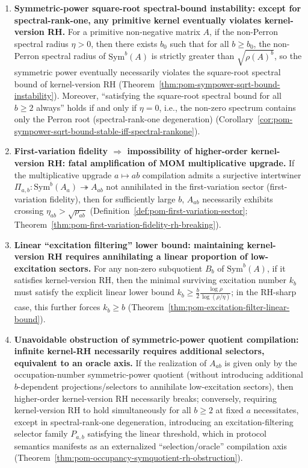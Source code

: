 \begin{enumerate}
  \item \textbf{Symmetric-power square-root spectral-bound instability: except for spectral-rank-one, any primitive kernel eventually violates kernel-version RH.}
  For a primitive non-negative matrix \(A\), if the non-Perron spectral radius \(\eta>0\), then there exists \(b_0\) such that for all \(b\ge b_0\), the non-Perron spectral radius of \(\mathrm{Sym}^b(A)\) is strictly greater than \(\sqrt{\rho(A)^b}\), so the symmetric power eventually necessarily violates the square-root spectral bound of kernel-version RH (Theorem~\ref{thm:pom-sympower-sqrt-bound-instability}).
  Moreover, ``satisfying the square-root spectral bound for all \(b\ge 2\) always'' holds if and only if \(\eta=0\), i.e., the non-zero spectrum contains only the Perron root (spectral-rank-one degeneration) (Corollary~\ref{cor:pom-sympower-sqrt-bound-stable-iff-spectral-rankone}).

  \item \textbf{First-variation fidelity \texorpdfstring{$\Rightarrow$}{=>} impossibility of higher-order kernel-version RH: fatal amplification of MOM multiplicative upgrade.}
  If the multiplicative upgrade \(a\mapsto ab\) compilation admits a surjective intertwiner \(\Pi_{a,b}:\mathrm{Sym}^b(A_a)\twoheadrightarrow A_{ab}\) not annihilated in the first-variation sector (first-variation fidelity), then for sufficiently large \(b\), \(A_{ab}\) necessarily exhibits crossing \(\eta_{ab}>\sqrt{\rho_{ab}}\) (Definition~\ref{def:pom-first-variation-sector}; Theorem~\ref{thm:pom-first-variation-fidelity-rh-breaking}).

  \item \textbf{Linear ``excitation filtering'' lower bound: maintaining kernel-version RH requires annihilating a linear proportion of low-excitation sectors.}
  For any non-zero subquotient \(B_b\) of \(\mathrm{Sym}^b(A)\), if it satisfies kernel-version RH, then the minimal surviving excitation number \(k_b\) must satisfy the explicit linear lower bound
  \(k_b\ge \frac{b}{2}\frac{\log\rho}{\log(\rho/\eta)}\); in the RH-sharp case, this further forces \(k_b\ge b\) (Theorem~\ref{thm:pom-excitation-filter-linear-bound}).

  \item \textbf{Unavoidable obstruction of symmetric-power quotient compilation: infinite kernel-RH necessarily requires additional selectors, equivalent to an oracle axis.}
  If the realization of \(A_{ab}\) is given only by the occupation-number symmetric-power quotient (without introducing additional \(b\)-dependent projections/selectors to annihilate low-excitation sectors), then higher-order kernel-version RH necessarily breaks;
  conversely, requiring kernel-version RH to hold simultaneously for all \(b\ge 2\) at fixed \(a\) necessitates, except in spectral-rank-one degeneration, introducing an excitation-filtering selector family \(P_{a,b}\) satisfying the linear threshold, which in protocol semantics manifests as an externalized ``selection/oracle'' compilation axis (Theorem~\ref{thm:pom-occupancy-symquotient-rh-obstruction}).
\end{enumerate}

